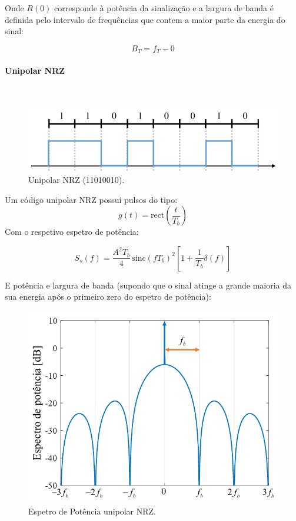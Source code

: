 \noindent Onde $R(0)$ corresponde à potência da sinalização e a largura de banda é definida pelo intervalo de frequências que contem a maior parte da energia do sinal:

$$
    \boxed{B_T = f_T - 0}
$$%

\clearpage
\paragraph*{Unipolar NRZ\protect\footnotemark[2]}\mbox{}\\
\label{line:unipolarNRZ}
\begin{figure}[H]
    \centering
    \includegraphics[width = 0.8\linewidth]{img/digital/line-codes/LUnipolarNRZ.png}
    \caption{Unipolar NRZ (11010010).}
    \label{fig:LUnipolarNRZ}
\end{figure}
\noindent Um código unipolar NRZ possui pulsos do tipo:
$$
    g(t) = \text{rect}\left(\frac{t}{T_b}\right)
$$
\noindent Com o respetivo espetro de potência:

$$
    \boxed{S_s(f) = \frac{A^2 T_b}{4}\, \text{sinc}(fT_b)^2\left[1 + \frac{1}{T_b}\delta(f)\right]}
$$

\noindent E potência e largura de banda (supondo que o sinal atinge a grande maioria da sua energia após o primeiro zero do espetro de potência):
\begin{figure}[H]
    \centering
    \includegraphics[width = 0.7\linewidth]{img/digital/line-codes/PUnipolarNRZ.png}
    \caption{Espetro de Potência unipolar NRZ.}
    \label{fig:PUnipolarNRZ}
\end{figure}

